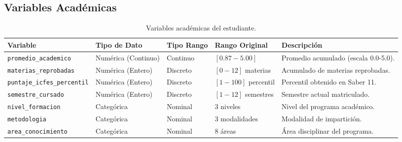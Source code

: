 \documentclass[11pt,a4paper]{article}
\begin{document}
\subsection{Variables Académicas}
\begin{table}[htbp]
\centering
\small
\begin{tabularx}{\textwidth}{l l l l X}
\toprule
\textbf{Variable} & \textbf{Tipo de Dato} & \textbf{Tipo Rango} & \textbf{Rango Original} & \textbf{Descripción} \\
\midrule
\texttt{promedio\_academico} & Numérica (Continuo) & Continuo & $[0.87 - 5.00]$ & Promedio acumulado (escala 0.0-5.0). \\
\texttt{materias\_reprobadas} & Numérica (Entero) & Discreto & $[0 - 12]$ materias & Acumulado de materias reprobadas. \\
\texttt{puntaje\_icfes\_percentil} & Numérica (Entero) & Discreto & $[1 - 100]$ percentil & Percentil obtenido en Saber 11. \\
\texttt{semestre\_cursado} & Numérica (Entero) & Discreto & $[1 - 12]$ semestres & Semestre actual matriculado. \\
\texttt{nivel\_formacion} & Categórica & Nominal & 3 niveles & Nivel del programa académico. \\
\texttt{metodologia} & Categórica & Nominal & 3 modalidades & Modalidad de impartición. \\
\texttt{area\_conocimiento} & Categórica & Nominal & 8 áreas & Área disciplinar del programa. \\
\bottomrule
\end{tabularx}
\caption{Variables académicas del estudiante.}
\end{table}
\end{document}
